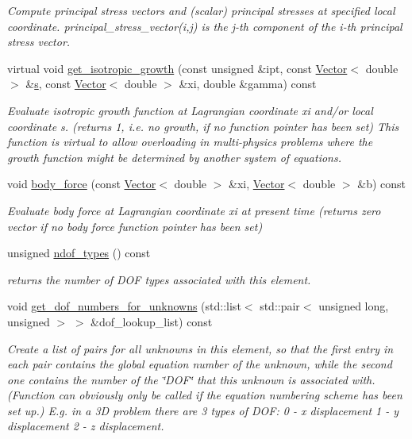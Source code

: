 \begin{DoxyCompactItemize}
\begin{DoxyCompactList}\small\item\em Compute principal stress vectors and (scalar) principal stresses at specified local coordinate. {\ttfamily principal\+\_\+stress\+\_\+vector(i,j)} is the j-\/th component of the i-\/th principal stress vector. \end{DoxyCompactList}\item 
virtual void \hyperlink{classoomph_1_1PVDEquationsBase_a63cc799ade8521758da4ef1d16964137}{get\+\_\+isotropic\+\_\+growth} (const unsigned \&ipt, const \hyperlink{classoomph_1_1Vector}{Vector}$<$ double $>$ \&\hyperlink{cfortran_8h_ab7123126e4885ef647dd9c6e3807a21c}{s}, const \hyperlink{classoomph_1_1Vector}{Vector}$<$ double $>$ \&xi, double \&gamma) const
\begin{DoxyCompactList}\small\item\em Evaluate isotropic growth function at Lagrangian coordinate xi and/or local coordinate s. (returns 1, i.\+e. no growth, if no function pointer has been set) This function is virtual to allow overloading in multi-\/physics problems where the growth function might be determined by another system of equations. \end{DoxyCompactList}\item 
void \hyperlink{classoomph_1_1PVDEquationsBase_add35ffbc2d8984fae27c4e1fb4c90b46}{body\+\_\+force} (const \hyperlink{classoomph_1_1Vector}{Vector}$<$ double $>$ \&xi, \hyperlink{classoomph_1_1Vector}{Vector}$<$ double $>$ \&b) const
\begin{DoxyCompactList}\small\item\em Evaluate body force at Lagrangian coordinate xi at present time (returns zero vector if no body force function pointer has been set) \end{DoxyCompactList}\item 
unsigned \hyperlink{classoomph_1_1PVDEquationsBase_a749f42fea2b7138a61193c2615b2d95c}{ndof\+\_\+types} () const
\begin{DoxyCompactList}\small\item\em returns the number of D\+OF types associated with this element. \end{DoxyCompactList}\item 
void \hyperlink{classoomph_1_1PVDEquationsBase_af17c01ce27e3a8aa21f86aaed70bc34e}{get\+\_\+dof\+\_\+numbers\+\_\+for\+\_\+unknowns} (std\+::list$<$ std\+::pair$<$ unsigned long, unsigned $>$ $>$ \&dof\+\_\+lookup\+\_\+list) const
\begin{DoxyCompactList}\small\item\em Create a list of pairs for all unknowns in this element, so that the first entry in each pair contains the global equation number of the unknown, while the second one contains the number of the \char`\"{}\+D\+O\+F\char`\"{} that this unknown is associated with. (Function can obviously only be called if the equation numbering scheme has been set up.) E.\+g. in a 3D problem there are 3 types of D\+OF\+: 0 -\/ x displacement 1 -\/ y displacement 2 -\/ z displacement. \end{DoxyCompactList}\item 

\end{DoxyCompactItemize}
